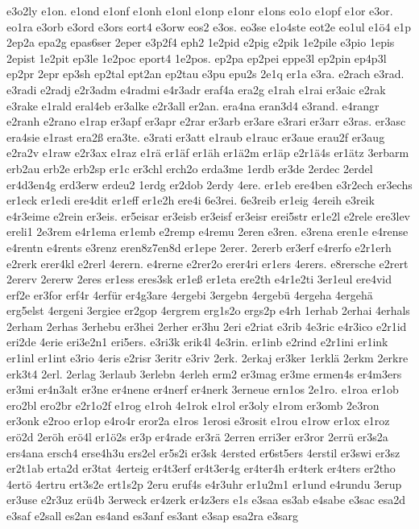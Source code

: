 {e3o2ly
e1on.
e1ond
e1onf
e1onh
e1onl
e1onp
e1onr
e1ons
eo1o
e1opf
e1or
e3or.
eo1ra
e3orb
e3ord
e3ors
eort4
e3orw
eos2
e3os.
eo3se
e1o4ste
eot2e
eo1ul
e1ö4
e1p
2ep2a
epa2g
epas6ser
2eper
e3p2f4
eph2
1e2pid
e2pig
e2pik
1e2pile
e3pio
1epis
2epist
1e2pit
ep3le
1e2poc
eport4
1e2pos.
ep2pa
ep2pei
eppe3l
ep2pin
ep4p3l
ep2pr
2epr
ep3sh
ep2tal
ept2an
ep2tau
e3pu
epu2s
2e1q
er1a
e3ra.
e2rach
e3rad.
e3radi
e2radj
e2r3adm
e4radmi
e4r3adr
eraf4a
era2g
e1rah
e1rai
er3aic
e2rak
e3rake
e1rald
eral4eb
er3alke
e2r3all
er2an.
era4na
eran3d4
e3rand.
e4rangr
e2ranh
e2rano
e1rap
er3apf
er3apr
e2rar
er3arb
er3are
e3rari
er3arr
e3ras.
er3asc
era4sie
e1rast
era2ß
era3te.
e3rati
er3att
e1raub
e1rauc
er3aue
erau2f
er3aug
e2ra2v
e1raw
e2r3ax
e1raz
e1rä
er1äf
er1äh
er1ä2m
er1äp
e2r1ä4s
er1ätz
3erbarm
erb2au
erb2e
erb2sp
er1c
er3chl
erch2o
erda3me
1erdb
er3de
2erdec
2erdel
er4d3en4g
erd3erw
erdeu2
1erdg
er2dob
2erdy
4ere.
er1eb
ere4ben
e3r2ech
er3echs
er1eck
er1edi
ere4dit
er1eff
er1e2h
ere4i
6e3rei.
6e3reib
er1eig
4ereih
e3reik
e4r3eime
e2rein
er3eis.
er5eisar
er3eisb
er3eisf
er3eisr
erei5str
er1e2l
e2rele
ere3lev
ereli1
2e3rem
e4r1ema
er1emb
e2remp
e4remu
2eren
e3ren.
e3rena
eren1e
e4rense
e4rentn
e4rents
e3renz
eren8z7en8d
er1epe
2erer.
2ererb
er3erf
e4rerfo
e2r1erh
e2rerk
erer4kl
e2rerl
4erern.
e4rerne
e2rer2o
erer4ri
er1ers
4erers.
e8rersche
e2rert
2ererv
2ererw
2eres
er1ess
eres3sk
er1eß
er1eta
ere2th
e4r1e2ti
3er1eul
ere4vid
erf2e
er3for
erf4r
4erfür
er4g3are
4ergebi
3ergebn
4ergebü
4ergeha
4ergehä
erg5elst
4ergeni
3ergiee
er2gop
4ergrem
erg1s2o
ergs2p
e4rh
1erhab
2erhai
4erhals
2erham
2erhas
3erhebu
er3hei
2erher
er3hu
2eri
e2riat
e3rib
4e3ric
e4r3ico
e2r1id
eri2de
4erie
eri3e2n1
eri5ers.
e3ri3k
erik4l
4e3rin.
er1inb
e2rind
e2r1ini
er1ink
er1inl
er1int
e3rio
4eris
e2risr
3eritr
e3riv
2erk.
2erkaj
er3ker
1erklä
2erkm
2erkre
erk3t4
2erl.
2erlag
3erlaub
3erlebn
4erleh
erm2
er3mag
er3me
ermen4s
er4m3ers
er3mi
er4n3alt
er3ne
er4nene
er4nerf
er4nerk
3erneue
ern1os
2e1ro.
e1roa
er1ob
ero2bl
ero2br
e2r1o2f
e1rog
e1roh
4e1rok
e1rol
er3oly
e1rom
er3omb
2e3ron
er3onk
e2roo
er1op
e4ro4r
eror2a
e1ros
1erosi
e3rosit
e1rou
e1row
er1ox
e1roz
erö2d
2eröh
erö4l
er1ö2s
er3p
er4rade
er3rä
2erren
erri3er
er3ror
2errü
er3s2a
ers4ana
ersch4
erse4h3u
ers2el
er5s2i
er3sk
4ersted
er6st5ers
4erstil
er3swi
er3sz
er2t1ab
erta2d
er3tat
4erteig
er4t3erf
er4t3er4g
er4ter4h
er4terk
er4ters
er2tho
4ertö
4ertru
ert3s2e
ert1s2p
2eru
eruf4s
e4r3uhr
er1u2m1
er1und
e4rundu
3erup
er3use
e2r3uz
erü4b
3erweck
er4zerk
er4z3ers
e1s
e3saa
es3ab
e4sabe
e3sac
esa2d
e3saf
e2sall
es2an
es4and
es3anf
es3ant
e3sap
esa2ra
e3sarg
}

